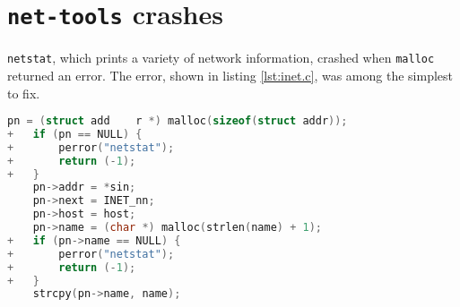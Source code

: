 \section{\texttt{net-tools} crashes}
\label{appendix:net-tools}

\texttt{netstat}, which prints a variety of network information, crashed when \texttt{malloc} returned an error. The error, shown in listing \ref{lst:inet.c}, was among the simplest to fix.

\begin{lstlisting}[label={lst:inet.c},firstnumber=213, caption={\texttt{lib/inet.c}}, language=C]
    pn = (struct add	r *) malloc(sizeof(struct addr));
+   if (pn == NULL) {
+   	perror("netstat");
+		return (-1);
+   }
    pn->addr = *sin;
    pn->next = INET_nn;
    pn->host = host;
    pn->name = (char *) malloc(strlen(name) + 1);
+   if (pn->name == NULL) {
+   	perror("netstat");
+		return (-1);
+   }
    strcpy(pn->name, name);
\end{lstlisting}
